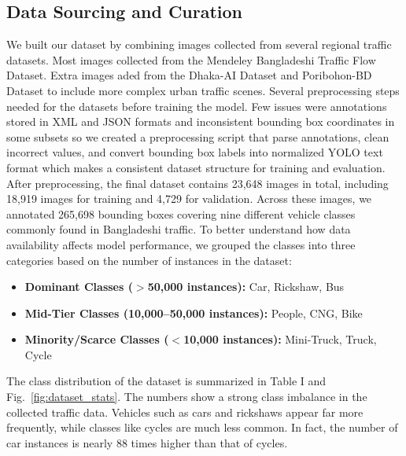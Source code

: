 \documentclass[sigconf]{acmart}
\begin{document}
\subsection{Data Sourcing and Curation}
We built our dataset by combining images collected from several regional traffic datasets. Most images collected from the Mendeley Bangladeshi Traffic Flow Dataset\cite{Islam2025BangladeshiTrafficFlow}. Extra images aded from the Dhaka-AI Dataset\cite{DVN/POREXF_2020} and Poribohon-BD Dataset\cite{19} to include more complex urban traffic scenes. Several preprocessing steps needed for the datasets before training the model. Few issues were annotations stored in XML and JSON formats and inconsistent bounding box coordinates in some subsets so we created a preprocessing script that parse annotations, clean incorrect values, and convert bounding box labels into normalized YOLO text format which makes a consistent dataset structure for training and evaluation. After preprocessing, the final dataset contains 23,648 images in total, including 18,919 images for training and 4,729 for validation. Across these images, we annotated 265,698 bounding boxes covering nine different vehicle classes commonly found in Bangladeshi traffic. To better understand how data availability affects model performance, we grouped the classes into three categories based on the number of instances in the dataset:

\begin{itemize}
    \item \textbf{Dominant Classes ($>$50,000 instances):} Car, Rickshaw, Bus
    \item \textbf{Mid-Tier Classes (10,000--50,000 instances):} People, CNG, Bike
    \item \textbf{Minority/Scarce Classes ($<$10,000 instances):} Mini-Truck, Truck, Cycle
\end{itemize}


The class distribution of the dataset is summarized in Table I and Fig.~\ref{fig:dataset_stats}. The numbers show a strong class imbalance in the collected traffic data. Vehicles such as cars and rickshaws appear far more frequently, while classes like cycles are much less common. In fact, the number of car instances is nearly 88 times higher than that of cycles.
\end{document}
